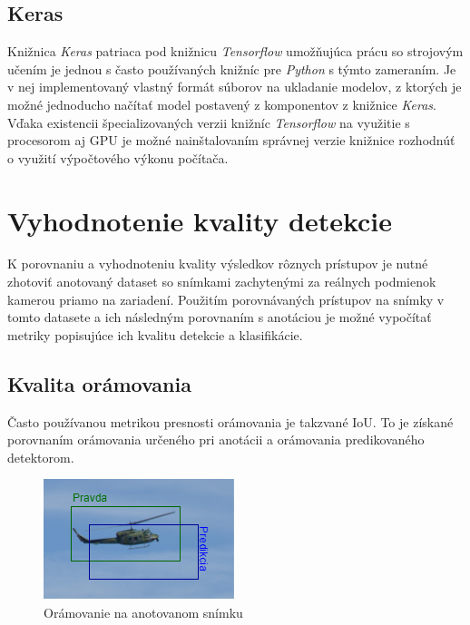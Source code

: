     \section{Keras}
        Knižnica \emph{Keras} patriaca pod knižnicu \emph{Tensorflow} umožňujúca prácu so strojovým učením je jednou s často používaných knižníc pre \emph{Python} s týmto zameraním. Je v nej implementovaný vlastný formát súborov na ukladanie modelov, z ktorých je možné jednoducho načítať model postavený z komponentov z knižnice \emph{Keras}. Vďaka existencii špecializovaných verzii knižníc \emph{Tensorflow} na využitie s procesorom aj GPU je možné nainštalovaním správnej verzie knižnice rozhodnúť o využití výpočtového výkonu počítača.

\chapter{Vyhodnotenie kvality detekcie}
    K porovnaniu a vyhodnoteniu kvality výsledkov rôznych prístupov je nutné zhotoviť anotovaný dataset so snímkami zachytenými za reálnych podmienok kamerou priamo na zariadení. Použitím porovnávaných prístupov na snímky v tomto datasete a ich následným porovnaním s anotáciou je možné vypočítať metriky popisujúce ich kvalitu detekcie a klasifikácie.

    \section{Kvalita orámovania}
        Často používanou metrikou presnosti orámovania je takzvané \ac{IoU}. To je získané porovnaním orámovania určeného pri anotácii a orámovania predikovaného detektorom.

        \begin{figure}[h]
            \centering
            \includegraphics[width=.6\textwidth]{obrazky/metrics/detection.drawio.png}
            \caption{Orámovanie na anotovanom snímku}
        \end{figure}

